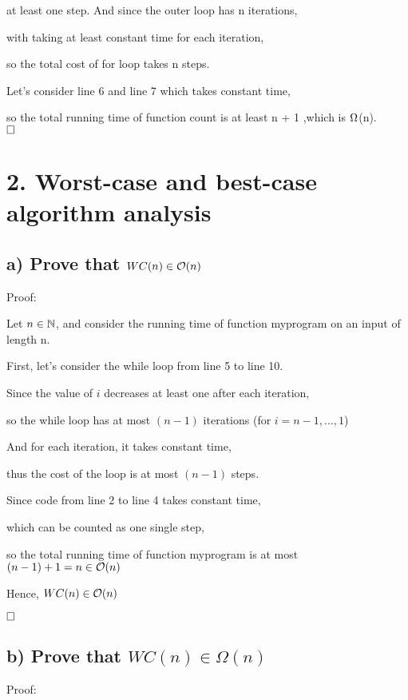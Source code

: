 \documentclass[12pt]{article}
\begin{document}
at least one step. And since the outer loop has n iterations, 

with taking at least constant time for each iteration, 

so the total cost of for loop takes n steps.

Let's consider line 6 and line 7 which takes constant time,

so the total running time of function count is at least n + 1 ,which is $\ohm$(n).\\


$\hfill\square$ 
\newpage


\vspace{20pt}

\section*{2. Worst-case and best-case algorithm analysis}
\vspace{20pt}
\subsection*{a) Prove that $WC(n) \in \mathcal O(n)$}
\vspace{20pt}
Proof:

Let $n\in \mathbb N$, and consider the running time of function myprogram on an input of length n.

First, let's consider the while loop from line 5 to line 10.

Since the value of $i$ decreases at least one after each iteration, 

so the while loop has at most $(n-1)$ iterations (for $i = n-1, ..., 1$)

And for each iteration, it takes constant time,

thus the cost of the loop is at most $(n-1)$ steps.

Since code from line 2 to line 4 takes constant time, 

which can be counted as one single step, 

so the total running time of function myprogram is at most $(n-1)+1 = n \in \mathcal O(n)$

Hence, $WC(n) \in \mathcal O(n)$


$\hfill\square$ 
\vspace{20pt}

\subsection*{b) Prove that $WC(n) \in \Omega(n)$}
\vspace{20pt}
Proof:
\end{document}
